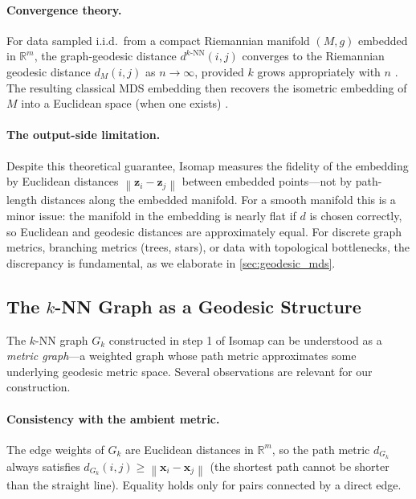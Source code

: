 \documentclass[11pt]{article}
\theoremstyle{definition}
\newcommand{\R}{\mathbb{R}}
\newcommand{\bx}{\mathbf{x}}
\newcommand{\bz}{\mathbf{z}}
\newcommand{\norm}[1]{\left\|#1\right\|}
\newcommand{\dknn}{d^{k\text{-NN}}}
\newcommand{\Gk}{G_k}
\begin{document}
\paragraph{Convergence theory.}
For data sampled i.i.d.\ from a compact Riemannian manifold $(M, g)$
embedded in $\R^m$, the graph-geodesic distance $\dknn(i,j)$ converges
to the Riemannian geodesic distance $d_M(i,j)$ as $n \to \infty$, provided
$k$ grows appropriately with $n$ \citep{bernstein2000graph,
  tenenbaum2000global, zha2003continuum, donoho2003hessian}.
The resulting classical MDS embedding then recovers the isometric embedding
of $M$ into a Euclidean space (when one exists) \citep{tenenbaum2000global}.

\paragraph{The output-side limitation.}
Despite this theoretical guarantee, Isomap measures the fidelity of the
embedding by Euclidean distances $\norm{\bz_i - \bz_j}$ between embedded
points---not by path-length distances along the embedded manifold.  For a
smooth manifold this is a minor issue: the manifold in the embedding is
nearly flat if $d$ is chosen correctly, so Euclidean and geodesic distances
are approximately equal.  For discrete graph metrics, branching metrics
(trees, stars), or data with topological bottlenecks, the discrepancy is
fundamental, as we elaborate in \cref{sec:geodesic_mds}.

\subsection{The $k$-NN Graph as a Geodesic Structure}
\label{sec:knn_graph}

The $k$-NN graph $\Gk$ constructed in step 1 of Isomap can be understood
as a \emph{metric graph}---a weighted graph whose path metric approximates
some underlying geodesic metric space.  Several observations are relevant
for our construction.

\paragraph{Consistency with the ambient metric.}
The edge weights of $\Gk$ are Euclidean distances in $\R^m$, so the path
metric $d_{\Gk}$ always satisfies $d_{\Gk}(i,j) \geq \norm{\bx_i - \bx_j}$
(the shortest path cannot be shorter than the straight line).  Equality
holds only for pairs connected by a direct edge.
\end{document}
